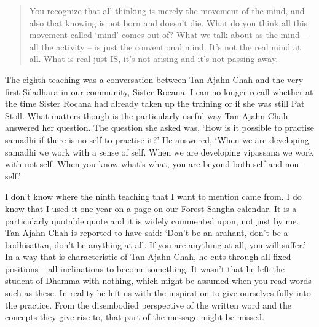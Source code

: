\begin{quotation}
You recognize that all thinking is merely the movement of the mind, and
also that knowing is not born and doesn't die. What do you think all
this movement called `mind' comes out of? What we talk about as the mind
-- all the activity -- is just the conventional mind. It's not the real
mind at all. What is real just IS, it's not arising and it's not passing
away.
\end{quotation}

The eighth teaching was a conversation between Tan Ajahn Chah and the
very first Siladhara in our community, Sister Rocana. I can no longer recall
whether at the time Sister Rocana had already taken up the training
or if she was still Pat Stoll. What matters though is the particularly
useful way Tan Ajahn Chah answered her question. The question she asked
was, `How is it possible to practise samadhi if there is no self to practise it?' He
answered, `When we are developing samadhi we work with a sense of self.
When we are developing vipassana we work with not-self.
When you know what's what, you are beyond both self and non-self.'

I don't know where the ninth teaching that I want to mention came from.
I do know that I used it one year on a page on our Forest Sangha
calendar. It is a particularly quotable quote\cite{centre}
and it is widely commented upon, not just by me. Tan
Ajahn Chah is reported to have said: `Don't be an arahant, don't be a
bodhisattva, don't be anything at all. If you are anything at all, you
will suffer.' In a way that is characteristic of Tan Ajahn Chah, he cuts
through all fixed positions -- all inclinations to become something. It
wasn't that he left the student of Dhamma with nothing, which might be
assumed when you read words such as these. In reality he left us with
the inspiration to give ourselves fully into the practice. From the
disembodied perspective of the written word and the concepts they give
rise to, that part of the message might be missed.

